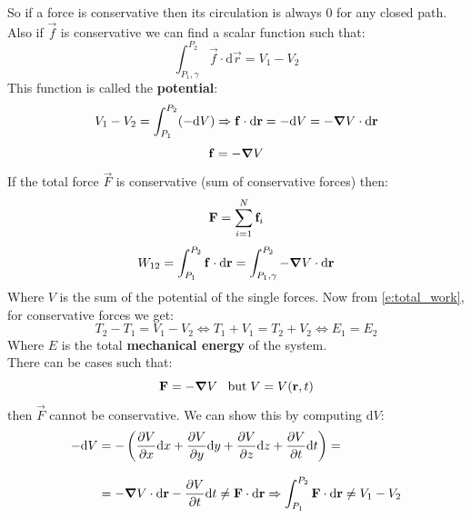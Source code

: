 So if a force is conservative then its circulation is always 0 for any closed path.\\
Also if $\vec{f}$ is conservative we can find a scalar function such that:
\begin{equation}
    \int_{P_1,\gamma}^{P_2}\vec{f}\cdot\mathrm{d}\vec{r} = V_1-V_2
\end{equation}
This function is called the \textbf{potential}:
\begin{equation}
    V_1-V_2 = \int_{P_1}^{P_2}(-\mathrm{d}V) \Rightarrow \vb{f}\cdot\mathrm{d}\vb{r} = -\mathrm{d}V = -\grad V \cdot \mathrm{d}\vb{r}
\end{equation}
\begin{equation}
    \vb{f} = -\grad V
\end{equation}
If the total force $\vec{F}$ is conservative (sum of conservative forces) then:
\begin{equation}
    \vb{F} = \displaystyle\sum_{i=1}^{N} \vb{f}_i
\end{equation}
\begin{equation}
    W_{12}=\int_{P_1}^{P_2}\vb{f}\cdot\mathrm{d}\vb{r} = \int_{P_1,\gamma}^{P_2}-\grad V\cdot\mathrm{d}\vb{r}
\end{equation}
Where $V$ is the sum of the potential of the single forces. Now from \eqref{e:total_work}, for conservative forces we get:
\begin{equation} \label{e:mech_energy}
    T_2 - T_1 = V_1 - V_2 \iff T_1 + V_1 = T_2 + V_2\iff E_1 = E_2
\end{equation}
Where $E$ is the total \textbf{mechanical energy} of the system.\\
There can be cases such that:
\begin{equation}
    \vb{F} = -\grad V \;\;\;\mathrm{but}\;V=V(\vb{r},t)
\end{equation}
then $\vec{F}$ cannot be conservative. We can show this by computing $\mathrm{d}V$:
\begin{equation}
    \begin{split}
      -\mathrm{d}V &= -\left(\dfrac{\partial V}{\partial x}\mathrm{d}x + \dfrac{\partial V}{\partial y}\mathrm{d}y + \dfrac{\partial V}{\partial z}\mathrm{d}z + \dfrac{\partial V}{\partial t}\mathrm{d}t\right) = \\[8pt]
    &= -\grad V \cdot\mathrm{d}\vb{r} - \dfrac{\partial V}{\partial t}\mathrm{d}t \neq \vb{F}\cdot\mathrm{d}\vb{r} \Rightarrow \int_{P_1}^{P_2}\vb{F}\cdot\mathrm{d}\vb{r} \neq V_1-V_2
    \end{split}
\end{equation}
